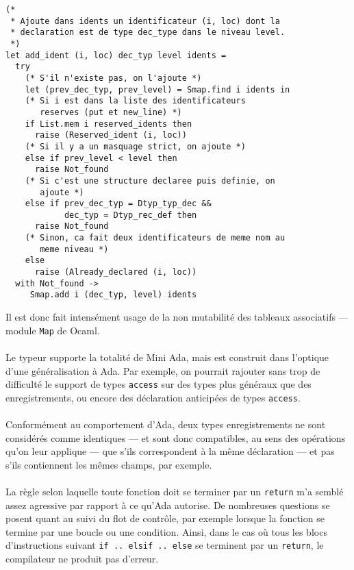 \documentclass[a4paper,12pt]{article}
\begin{document}
\begin{lstlisting}
(*
 * Ajoute dans idents un identificateur (i, loc) dont la
 * declaration est de type dec_type dans le niveau level.
 *)
let add_ident (i, loc) dec_typ level idents =
  try  
    (* S'il n'existe pas, on l'ajoute *)
    let (prev_dec_typ, prev_level) = Smap.find i idents in
    (* Si i est dans la liste des identificateurs
       reserves (put et new_line) *)
    if List.mem i reserved_idents then
      raise (Reserved_ident (i, loc))
    (* Si il y a un masquage strict, on ajoute *)
    else if prev_level < level then
      raise Not_found 
    (* Si c'est une structure declaree puis definie, on
       ajoute *)
    else if prev_dec_typ = Dtyp_typ_dec &&
            dec_typ = Dtyp_rec_def then
      raise Not_found
    (* Sinon, ca fait deux identificateurs de meme nom au
       meme niveau *)
    else
      raise (Already_declared (i, loc))
  with Not_found ->
     Smap.add i (dec_typ, level) idents
\end{lstlisting}

Il est donc fait intensément usage de la non mutabilité des tableaux associatifs --- module \texttt{Map} de Ocaml.

\paragraph*{}
Le typeur supporte la totalité de Mini Ada, mais est construit dans l'optique d'une généralisation à Ada. Par exemple, on pourrait rajouter sans trop de difficulté le support de types \texttt{access} sur des types plus généraux que des enregistrements, ou encore des déclaration anticipées de types \texttt{access}. 

\paragraph*{}
Conformément au comportement d'Ada, deux types enregistrements ne sont considérés comme identiques --- et sont donc compatibles, au sens des opérations qu'on leur applique --- que s'ils correspondent à la même déclaration --- et pas s'ils contiennent les mêmes champs, par exemple.

\paragraph*{}
La règle selon laquelle toute fonction doit se terminer par un \texttt{return} m'a semblé assez agressive par rapport à ce qu'Ada autorise. De nombreuses questions se posent quant au suivi du flot de contrôle, par exemple lorsque la fonction se termine par une boucle ou une condition. Ainsi, dans le cas où tous les blocs d'instructions suivant \texttt{if .. elsif .. else} se terminent par un \texttt{return}, le compilateur ne produit pas d'erreur.
\end{document}
